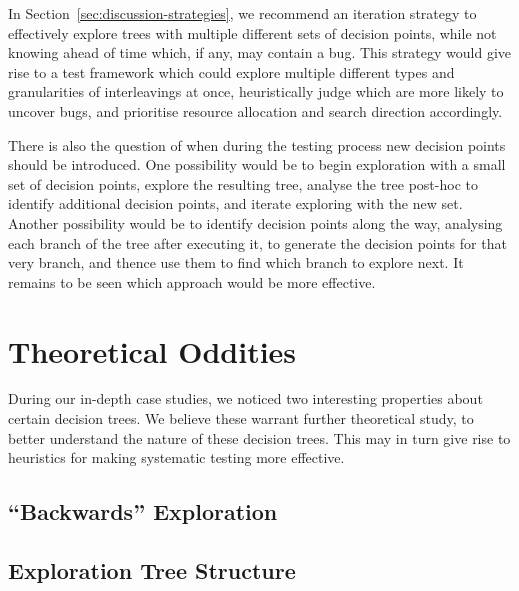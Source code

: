 In Section~\ref{sec:discussion-strategies}, we recommend an iteration strategy to effectively explore trees with multiple different sets of decision points, while not knowing ahead of time which, if any, may contain a bug.
This strategy would give rise to a test framework which could explore multiple different types and granularities of interleavings at once, heuristically judge which are more likely to uncover bugs, and prioritise resource allocation and search direction accordingly.

There is also the question of when during the testing process new decision points should be introduced.
One possibility would be to begin exploration with a small set of decision points, explore the resulting tree, analyse the tree post-hoc to identify additional decision points, and iterate exploring with the new set.
Another possibility would be to identify decision points along the way, analysing each branch of the tree after executing it, to generate the decision points for that very branch, and thence use them to find which branch to explore next.
It remains to be seen which approach would be more effective.


\section{Theoretical Oddities}
\label{sec:future-theory}

During our in-depth case studies, we noticed two interesting properties about certain decision trees. We believe these warrant further theoretical study, to better understand the nature of these decision trees. This may in turn give rise to heuristics for making systematic testing more effective.

\subsection{``Backwards'' Exploration}
\label{sec:future-backwards}

\subsection{Exploration Tree Structure}
\label{sec:future-nadim}
